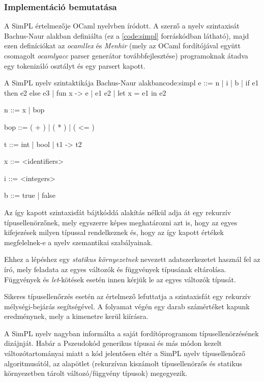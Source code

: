 \subsubsection{Implementáció bemutatása}

A SimPL értelmezője OCaml nyelvben íródott. A szerző a nyelv szintaxisát Bachus-Naur alakban definiálta (ez a \ref{code:simpl} forráskódban látható), majd ezen definíciókat az \textit{ocamllex} és \textit{Menhir} (mely az OCaml fordítójával együtt csomagolt \textit{ocamlyacc} parser generátor továbbfejlesztése) programoknak átadva egy tokenizáló osztályt és egy parsert kapott.

\begin{code}{A SimPL nyelv szintaktikája Bachus-Naur alakban}{code:simpl}
e ::= n | i | b
    | if e1 then e2 else e3
    | fun x -> e
    | e1 e2
    | let x = e1 in e2 

n ::= x | bop

bop ::= ( + ) | ( * ) | ( <= )

t ::= int | bool | t1 -> t2

x ::= <identifiers>

i ::= <integers>

b ::= true | false
\end{code}

Az így kapott szintaxisfát bájtkóddá alakítás nélkül adja át egy rekurzív típusellenörzőnek, mely egyszerre képes meghatározni azt is, hogy az egyes kifejezések milyen típussal rendelkeznek és, hogy az így kapott értékek megfelelnek-e a nyelv szemantikai szabályainak.

Ehhez a lépéshez egy \textit{statikus környezetnek} nevezett adatszerkezetet használ fel az író, mely feladata az egyes változók és függvények típusának eltárolása. Függvények és \textit{let}-kötések esetén innen kérjük le az egyes változók típusát.

Sikeres típusellenőrzés esetén az értelmező lefuttatja a szintaxisfát egy rekurzív mélységi-bejárás segítségével. A folyamat végén egy darab számértéket kapunk eredménynek, mely a kimenetre kerül kiírásra.

A SimPL nyelv nagyban informálta a saját fordítóprogramom típusellenörzésének dizájnját. Habár a Pszeudokód generikus típusai és más módon kezelt változótartományai miatt a kód jelentősen eltér a SimPL nyelv típusellenőrző algoritmusától, az alapötlet (rekurzívan kiszámolt típusellenörzős és statikus környezetben tárolt változó/függvény típusok) megegyezik.